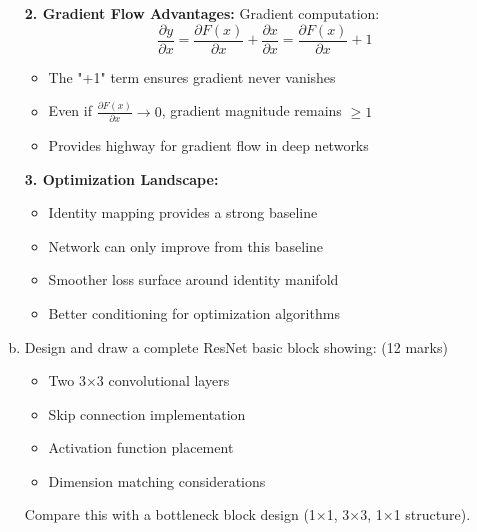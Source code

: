 \documentclass[12pt]{article}
\begin{document}
\begin{enumerate}[(a)]
{    \textbf{2. Gradient Flow Advantages:}
    Gradient computation:
    $$\frac{\partial y}{\partial x} = \frac{\partial F(x)}{\partial x} + \frac{\partial x}{\partial x} = \frac{\partial F(x)}{\partial x} + 1$$
    
    \begin{itemize}
        \item The "+1" term ensures gradient never vanishes
        \item Even if $\frac{\partial F(x)}{\partial x} \to 0$, gradient magnitude remains $\geq 1$
        \item Provides highway for gradient flow in deep networks
    \end{itemize}
    
    \textbf{3. Optimization Landscape:}
    \begin{itemize}
        \item Identity mapping provides a strong baseline
        \item Network can only improve from this baseline
        \item Smoother loss surface around identity manifold
        \item Better conditioning for optimization algorithms
    \end{itemize}
    }
    
    \item Design and draw a complete ResNet basic block showing: \hfill (12 marks)
    \begin{itemize}
        \item Two 3×3 convolutional layers
        \item Skip connection implementation
        \item Activation function placement
        \item Dimension matching considerations
    \end{itemize}
    
    Compare this with a bottleneck block design (1×1, 3×3, 1×1 structure).
    
    \begin{center}
\end{center}
\end{enumerate}
\end{document}

